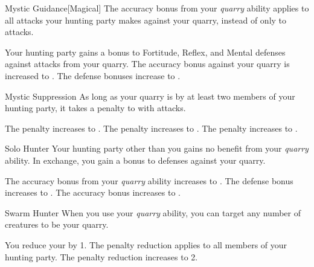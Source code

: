 {            \begin{freeability}{Mystic Guidance}[Magical]
                The accuracy bonus from your \textit{quarry} ability applies to all attacks your hunting party makes against your quarry, instead of only to  attacks.

                \rankline
                 Your hunting party gains a  bonus to Fortitude, Reflex, and Mental defenses against attacks from your quarry.
                 The accuracy bonus against your quarry is increased to .
                 The defense bonuses increase to .
            \end{freeability}

            \begin{freeability}{Mystic Suppression}
                As long as your quarry is  by at least two members of your hunting party, it takes a  penalty to  with  attacks.

                \rankline
                 The penalty increases to . 
                 The penalty increases to .
                 The penalty increases to .
            \end{freeability}

            \begin{freeability}{Solo Hunter}
                Your hunting party other than you gains no benefit from your \textit{quarry} ability.
                In exchange, you gain a  bonus to defenses against your quarry.

                \rankline
                 The accuracy bonus from your \textit{quarry} ability increases to .
                 The defense bonus increases to .
                 The accuracy bonus increases to .
            \end{freeability}

            \begin{freeability}{Swarm Hunter}
                When you use your \textit{quarry} ability, you can target any number of creatures to be your quarry.

                \rankline
                 You reduce your  by 1.
                 The penalty reduction applies to all members of your hunting party.
                 The penalty reduction increases to 2.
            \end{freeability}

}
